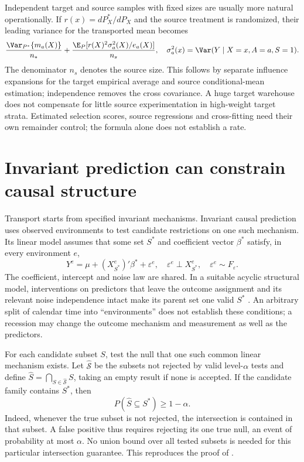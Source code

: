 Independent target and source samples with fixed sizes are usually
more natural operationally. If $r(x)=dP^*_X/dP_X$ and the source
treatment is randomized, their leading variance for the transported
mean becomes
\[
 \frac{\Var_{P^*}\{m_a(X)\}}{n_*}
 +\frac{\E_P[r(X)^2\sigma_a^2(X)/e_a(X)]}{n_s},
 \quad \sigma_a^2(x)=\Var(Y\mid X=x,A=a,S=1).
\]
The denominator $n_s$ denotes the source size. This follows by
separate influence expansions for the target empirical average and
source conditional-mean estimation; independence removes the cross
covariance. A huge target warehouse does not compensate for little
source experimentation in high-weight target strata. Estimated
selection scores, source regressions and cross-fitting need their
own remainder control; the formula alone does not establish a rate.

\section{Invariant prediction can constrain causal structure}
\label{r3:invariance}
Transport starts from specified invariant mechanisms. Invariant causal
prediction uses observed environments to test candidate restrictions
on one such mechanism. Its linear model assumes that some set $S^*$
and coefficient vector $\beta^*$ satisfy, in every environment $e$,
\[
 Y^e=\mu+(X^e_{S^*})'\beta^*+\varepsilon^e,\quad
 \varepsilon^e\perp X^e_{S^*},\quad
 \varepsilon^e\sim F_\varepsilon.
\]
The coefficient, intercept and noise law are shared. In a suitable
acyclic structural model, interventions on predictors that leave
the outcome assignment and its relevant noise independence intact
make its parent set one valid $S^*$
\citep[Assumption 1 and Proposition 1]{petersicp2016}.
An arbitrary split of calendar time into ``environments'' does not
establish these conditions; a recession may change the outcome
mechanism and measurement as well as the predictors.

For each candidate subset $S$, test the null that one such common
linear mechanism exists. Let $\widehat{\mathcal S}$ be the subsets
not rejected by valid level-$\alpha$ tests and define
$\widehat S=\bigcap_{S\in\widehat{\mathcal S}}S$, taking an empty
result if none is accepted. If the candidate family contains $S^*$,
then
\begin{equation}
 P(\widehat S\subseteq S^*)\ge1-\alpha.
 \label{r3:icp-guarantee}
\end{equation}
Indeed, whenever the true subset is not rejected, the intersection
is contained in that subset. A false positive thus requires rejecting
its one true null, an event of probability at most $\alpha$. No
union bound over all tested subsets is needed for this particular
intersection guarantee. This reproduces the proof of
\citet[Theorem 1]{petersicp2016}.

